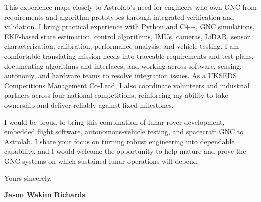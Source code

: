 \documentclass[10pt,a4paper]{article}
\newcommand{\BodySize}{9.25pt}
\newcommand{\BodyLineSize}{12.1pt}
\newcommand{\ParagraphSpacing}{10pt}       %
\newcommand{\ClosingBefore}{7pt}          %
\newcommand{\SignatureSpace}{22pt}         %
\newcommand{\LetterParagraph}[1]{%
    \noindent #1\par
    \addvspace{\ParagraphSpacing}%
}
\newcommand{\LetterFinalParagraph}[1]{%
    \noindent #1\par
}
\begin{document}
{    \LetterParagraph{%
        This experience maps closely to Astrolab's need for engineers who own GNC from
        requirements and algorithm prototypes through integrated verification and
        validation. I bring practical experience with Python and C++, GNC simulations,
        EKF-based state estimation, control algorithms, IMUs, cameras, LiDAR, sensor
        characterization, calibration, performance analysis, and vehicle testing. I am
        comfortable translating mission needs into traceable requirements and test
        plans, documenting algorithms and interfaces, and working across software,
        sensing, autonomy, and hardware teams to resolve integration issues. As a UKSEDS
        Competitions Management Co-Lead, I also coordinate volunteers and industrial
        partners across four national competitions, reinforcing my ability to take
        ownership and deliver reliably against fixed milestones.%
    }

    \LetterFinalParagraph{%
        I would be proud to bring this combination of lunar-rover development, embedded
        flight software, autonomous-vehicle testing, and spacecraft GNC to Astrolab. I
        share your focus on turning robust engineering into dependable capability, and I
        would welcome the opportunity to help mature and prove the GNC systems on which
        sustained lunar operations will depend.%
    }
}


\vspace{\ClosingBefore}

{\fontsize{\BodySize}{\BodyLineSize}\selectfont
    \textcolor{CVDarkGray}{Yours sincerely,}}

\vspace{\SignatureSpace}

{\fontsize{\BodySize}{\BodyLineSize}\selectfont
    \textbf{\textcolor{CVBlack}{Jason Wakim Richards}}}
\end{document}
